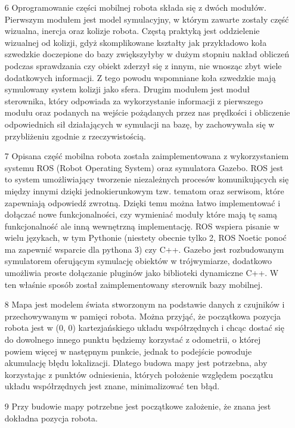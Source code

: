 \documentclass[10pt,a4paper]{article}
\begin{document}
\begin{itemize}
    \item[6]
    Oprogramowanie części mobilnej robota składa się z dwóch modułów. 
    Pierwszym modułem jest model symulacyjny, 
    w którym zawarte zostały część wizualna, inercja oraz kolizje robota.
        Częstą praktyką jest oddzielenie wizualnej od kolizji, gdyż skomplikowane kształty 
    jak przykładowo koła szwedzkie doczepione do bazy zwiększyłyby w dużym stopniu nakład obliczeń podczas sprawdzania czy obiekt zderzył się z innym, nie wnosząc zbyt wiele dodatkowych informacji.
    Z tego powodu wspomniane koła szwedzkie mają symulowany system kolizji jako sfera.
        Drugim modułem jest moduł sterownika, który odpowiada za wykorzystanie informacji z pierwszego modułu oraz podanych na wejście pożądanych przez nas prędkości i obliczenie odpowiednich sił działających w symulacji na bazę, by zachowywała się w przybliżeniu zgodnie z rzeczywistością.
    \item[7]
    Opisana część mobilna robota została zaimplementowana z wykorzystaniem systemu ROS (Robot Operating System) oraz symulatora Gazebo. 
    ROS jest to system umożliwiający tworzenie niezależnych procesów komunikujących się między innymi dzięki jednokierunkowym tzw. tematom oraz serwisom, które zapewniają odpowiedź zwrotną.
     Dzięki temu można łatwo implementować i dołączać nowe funkcjonalności, czy wymieniać moduły które mają tę samą funkcjonalność ale inną wewnętrzną implementację.
    ROS wspiera pisanie w wielu językach, w tym Pythonie (niestety obecnie tylko 2, ROS Noetic ponoć ma zapewnić wsparcie dla pythona 3) czy C++. 
    Gazebo jest rozbudowanym symulatorem oferującym symulację obiektów w trójwymiarze, dodatkowo umożliwia proste dołączanie pluginów jako biblioteki dynamiczne C++.
    W ten właśnie sposób został zaimplementowany sterownik bazy mobilnej.
    \item[8]
    Mapa jest modelem świata stworzonym na podstawie danych z czujników i przechowywanym w pamięci robota. 
    Można przyjąć, że początkowa pozycja robota jest w (0, 0) kartezjańskiego układu współrzędnych i chcąc dostać się do  dowolnego innego punktu będziemy korzystać z odometrii,
    o której powiem więcej w następnym punkcie, jednak to podejście powoduje akumulację błędu lokalizacji.
    Dlatego budowa mapy jest potrzebna, aby korzystając z punktów odniesienia,
    których położenie względem początku układu współrzędnych jest znane, minimalizować ten błąd.
    \item[9]
    Przy budowie mapy potrzebne jest początkowe założenie, że znana jest dokładna pozycja robota. 

\end{itemize}
\end{document}
